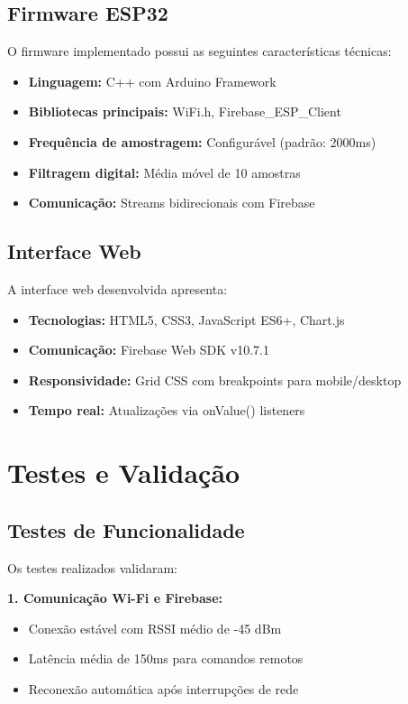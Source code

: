 \documentclass[twoside,english,brazilian]{UNISINOSmonografia}
\begin{document}
\subsection{Firmware ESP32}
O firmware implementado possui as seguintes características técnicas:
\begin{itemize}
    \item \textbf{Linguagem:} C++ com Arduino Framework
    \item \textbf{Bibliotecas principais:} WiFi.h, Firebase\_ESP\_Client
    \item \textbf{Frequência de amostragem:} Configurável (padrão: 2000ms)
    \item \textbf{Filtragem digital:} Média móvel de 10 amostras
    \item \textbf{Comunicação:} Streams bidirecionais com Firebase
\end{itemize}

\subsection{Interface Web}
A interface web desenvolvida apresenta:
\begin{itemize}
    \item \textbf{Tecnologias:} HTML5, CSS3, JavaScript ES6+, Chart.js
    \item \textbf{Comunicação:} Firebase Web SDK v10.7.1
    \item \textbf{Responsividade:} Grid CSS com breakpoints para mobile/desktop
    \item \textbf{Tempo real:} Atualizações via onValue() listeners
\end{itemize}

\section{Testes e Validação}

\subsection{Testes de Funcionalidade}
Os testes realizados validaram:

\textbf{1. Comunicação Wi-Fi e Firebase:}
\begin{itemize}
    \item Conexão estável com RSSI médio de -45 dBm
    \item Latência média de 150ms para comandos remotos
    \item Reconexão automática após interrupções de rede
\end{itemize}
\end{document}
